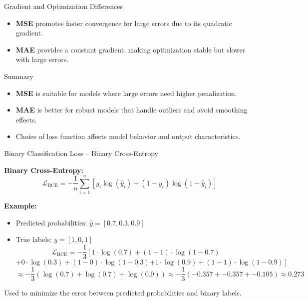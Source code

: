 \documentclass[serif, aspectratio=169]{beamer}
\begin{document}
\begin{frame}{Gradient and Optimization Differences}
    \begin{itemize}
        \item \textbf{MSE} promotes faster convergence for large errors due to its quadratic gradient.
        \item \textbf{MAE} provides a constant gradient, making optimization stable but slower with large errors.
    \end{itemize}
\end{frame}

\begin{frame}{Summary}
    \begin{itemize}
        \item \textbf{MSE} is suitable for models where large errors need higher penalization.
        \item \textbf{MAE} is better for robust models that handle outliers and avoid smoothing effects.
        \item Choice of loss function affects model behavior and output characteristics.
    \end{itemize}
\end{frame}
\begin{frame}{Binary Classification Loss – Binary Cross-Entropy}

    \textbf{Binary Cross-Entropy:}
    \vspace{-0.5cm}
    \[
    \mathcal{L}_{\text{BCE}} = -\frac{1}{n} \sum_{i=1}^{n} \left[ y_i \log(\hat{y}_i) + (1 - y_i) \log(1 - \hat{y}_i) \right]
    \]

    \textbf{Example:}
    \begin{itemize}
        \item Predicted probabilities: \( \hat{y} = [0.7, 0.3, 0.9] \)
        \item True labels: \( y = [1, 0, 1] \)
        \vspace{-0.4cm}
        \[
        \mathcal{L}_{\text{BCE}} = -\frac{1}{3} \left[ 1 \cdot \log(0.7) + (1 - 1) \cdot \log(1 - 0.7) \right.
        \]
        \[
        + 0 \cdot \log(0.3) + (1 - 0) \cdot \log(1 - 0.3) 
        \left. + 1 \cdot \log(0.9) + (1 - 1) \cdot \log(1 - 0.9) \right]
        \]
        \[
        \approx -\frac{1}{3} \left( \log(0.7) + \log(0.7) + \log(0.9) \right)
        \approx -\frac{1}{3} \left( -0.357 + -0.357 + -0.105 \right) \approx 0.273
        \]
    \end{itemize}
    Used to minimize the error between predicted probabilities and binary labels.
    
\end{frame}
\end{document}
